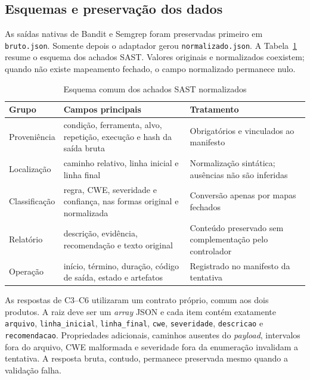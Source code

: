 \subsection{Esquemas e preservação dos dados}\label{subsec:esquema-comum-achados}

As saídas nativas de Bandit e Semgrep foram preservadas primeiro em \texttt{bruto.json}. Somente depois o adaptador gerou \texttt{normalizado.json}. A Tabela~\ref{tab:esquema-achado-comum} resume o esquema dos achados SAST. Valores originais e normalizados coexistem; quando não existe mapeamento fechado, o campo normalizado permanece nulo.

\begin{table}[htb]
\ABNTEXfontereduzida
\caption{Esquema comum dos achados SAST normalizados}
\label{tab:esquema-achado-comum}
\centering
\begin{tabularx}{\textwidth}{|l|X|X|}
\hline
\textbf{Grupo} & \textbf{Campos principais} & \textbf{Tratamento} \\
\hline
Proveniência & condição, ferramenta, alvo, repetição, execução e hash da saída bruta & Obrigatórios e vinculados ao manifesto \\
\hline
Localização & caminho relativo, linha inicial e linha final & Normalização sintática; ausências não são inferidas \\
\hline
Classificação & regra, CWE, severidade e confiança, nas formas original e normalizada & Conversão apenas por mapas fechados \\
\hline
Relatório & descrição, evidência, recomendação e texto original & Conteúdo preservado sem complementação pelo controlador \\
\hline
Operação & início, término, duração, código de saída, estado e artefatos & Registrado no manifesto da tentativa \\
\hline
\end{tabularx}
\end{table}

As respostas de C3--C6 utilizaram um contrato próprio, comum aos dois produtos. A raiz deve ser um \textit{array} JSON e cada item contém exatamente \texttt{arquivo}, \texttt{linha\_inicial}, \texttt{linha\_final}, \texttt{cwe}, \texttt{severidade}, \texttt{descricao} e \texttt{recomendacao}. Propriedades adicionais, caminhos ausentes do \textit{payload}, intervalos fora do arquivo, CWE malformada e severidade fora da enumeração invalidam a tentativa. A resposta bruta, contudo, permanece preservada mesmo quando a validação falha.

